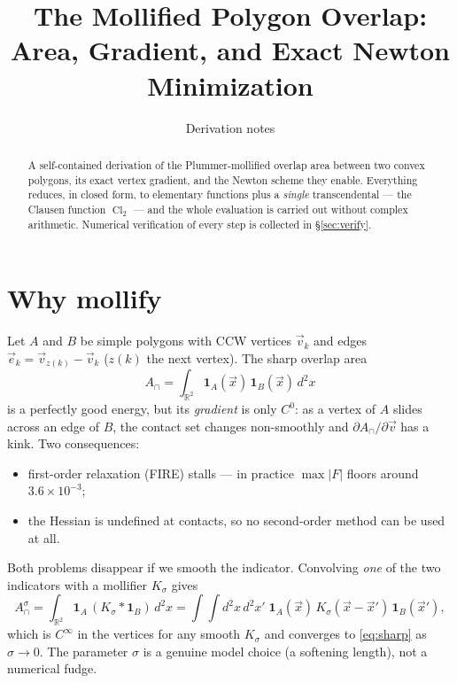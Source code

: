 \documentclass[11pt]{article}
\title{The Mollified Polygon Overlap:\\ Area, Gradient, and Exact Newton Minimization}
\author{Derivation notes}
\date{}
\numberwithin{equation}{section}
\newcommand{\vv}[1]{\vec{#1}}
\DeclareMathOperator{\Cl}{Cl}
\begin{document}
\maketitle

\begin{abstract}
\noindent A self-contained derivation of the Plummer-mollified overlap area between two convex
polygons, its exact vertex gradient, and the Newton scheme they enable. Everything reduces, in closed
form, to elementary functions plus a \emph{single} transcendental --- the Clausen function
$\Cl_2$ --- and the whole evaluation is carried out without complex arithmetic. Numerical
verification of every step is collected in \S\ref{sec:verify}.
\end{abstract}

\tableofcontents

\section{Why mollify}\label{sec:why}

Let $A$ and $B$ be simple polygons with CCW vertices $\vv v_k$ and edges
$\vv e_k=\vv v_{z(k)}-\vv v_k$ ($z(k)$ the next vertex). The sharp overlap area
\begin{equation}\label{eq:sharp}
  A_\cap=\int_{\mathbb R^2}\mathbf 1_A(\vv x)\,\mathbf 1_B(\vv x)\,d^2x
\end{equation}
is a perfectly good energy, but its \emph{gradient} is only $C^0$: as a vertex of $A$ slides across an
edge of $B$, the contact set changes non-smoothly and $\partial A_\cap/\partial\vv v$ has a kink. Two
consequences:
\begin{itemize}
\item first-order relaxation (FIRE) stalls --- in practice $\max|F|$ floors around $3.6\times10^{-3}$;
\item the Hessian is undefined at contacts, so no second-order method can be used at all.
\end{itemize}
Both problems disappear if we smooth the indicator. Convolving \emph{one} of the two indicators with a
mollifier $K_\sigma$ gives
\begin{equation}\label{eq:Acapsig}
  A_\cap^\sigma=\int_{\mathbb R^2}\mathbf 1_A\,(K_\sigma*\mathbf 1_B)\,d^2x
  =\int\!\!\int d^2x\,d^2x'\;\mathbf 1_A(\vv x)\,K_\sigma(\vv x-\vv x')\,\mathbf 1_B(\vv x') ,
\end{equation}
which is $C^\infty$ in the vertices for any smooth $K_\sigma$ and converges to \eqref{eq:sharp} as
$\sigma\to0$. The parameter $\sigma$ is a genuine model choice (a softening length), not a numerical
fudge.
\end{document}
